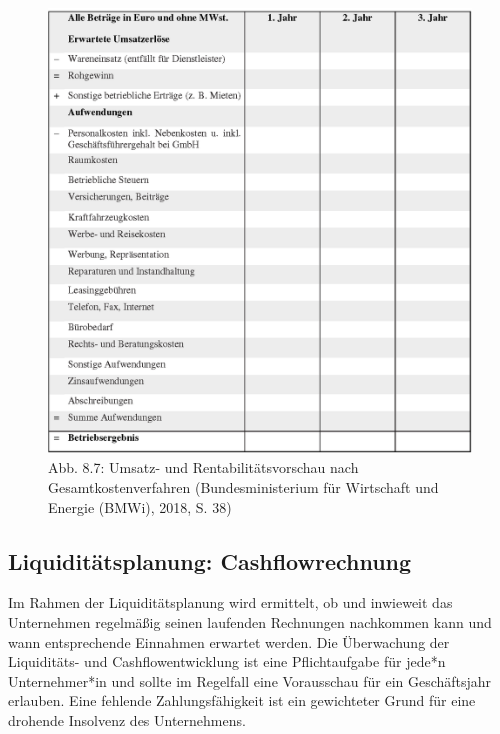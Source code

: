 \documentclass[
  letterpaper,
]{book}
\begin{document}
\begin{figure}

\includegraphics[width=0.75\linewidth,height=\textheight,keepaspectratio]{images/figure87.png} \hfill{}

\caption{Abb. 8.7: Umsatz- und Rentabilitätsvorschau nach
Gesamtkostenverfahren (Bundesministerium für Wirtschaft und Energie
(BMWi), 2018, S. 38)}

\end{figure}%

\subsection{Liquiditätsplanung:
Cashflowrechnung}\label{liquidittsplanung-cashflowrechnung}

Im Rahmen der Liquiditätsplanung wird ermittelt, ob und inwieweit das
Unternehmen regelmäßig seinen laufenden Rechnungen nachkommen kann und
wann entsprechende Einnahmen erwartet werden. Die Überwachung der
Liquiditäts- und Cashflowentwicklung ist eine Pflichtaufgabe für jede*n
Unternehmer*in und sollte im Regelfall eine Vorausschau für ein
Geschäftsjahr erlauben. Eine fehlende Zahlungsfähigkeit ist ein
gewichteter Grund für eine drohende Insolvenz des Unternehmens.
\end{document}
